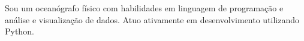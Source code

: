 \documentclass[9pt]{developercv} %
\begin{document}
\vspace{-0.2cm}

\begin{minipage}[t]{0.6\textwidth} %

Sou um oceanógrafo físico com habilidades em linguagem de programação e análise e visualização de dados. Atuo ativamente em desenvolvimento utilizando Python.
\end{minipage}
\hspace{0.3cm}
\hfill %
\begin{minipage}[t]{0.5\textwidth} %
	
	\vspace{-\baselineskip} %
	\vspace{-0.9cm}
	\begin{barchart}{5.5}
	\end{barchart}
\end{minipage}
\vspace{-0.1cm}
\begin{center}
\end{center}

\vspace{-0.2cm}
\end{document}
